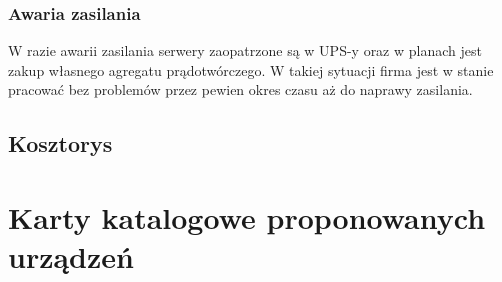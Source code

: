 \documentclass{article}
\begin{document}
\subsubsection{Awaria zasilania}
\par W razie awarii zasilania serwery zaopatrzone są w UPS-y oraz w planach jest zakup własnego agregatu prądotwórczego. W takiej sytuacji firma jest w stanie pracować bez problemów
przez pewien okres czasu aż do naprawy zasilania.

\subsection{Kosztorys}

\newpage
\section{Karty katalogowe proponowanych urządzeń}

%
%
%	
%

\end{document}
